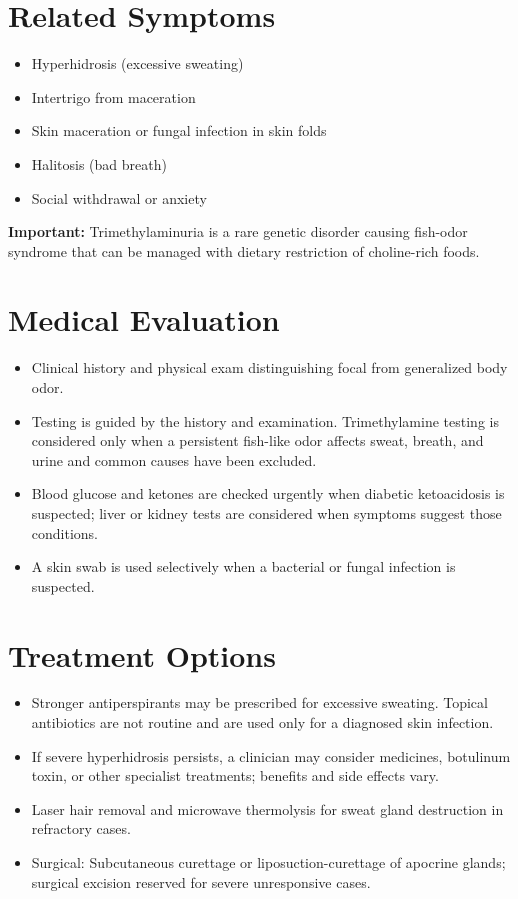 \section*{Related Symptoms}
\begin{itemize}
 \item Hyperhidrosis (excessive sweating)
 \item Intertrigo from maceration
 \item Skin maceration or fungal infection in skin folds
 \item Halitosis (bad breath)
 \item Social withdrawal or anxiety
\end{itemize}
\textbf{Important:} Trimethylaminuria is a rare genetic disorder causing fish-odor syndrome that can be managed with dietary restriction of choline-rich foods.

\section*{Medical Evaluation}
\begin{itemize}
 \item Clinical history and physical exam distinguishing focal from generalized body odor.
 \item Testing is guided by the history and examination. Trimethylamine testing is considered only when a persistent fish-like odor affects sweat, breath, and urine and common causes have been excluded.
 \item Blood glucose and ketones are checked urgently when diabetic ketoacidosis is suspected; liver or kidney tests are considered when symptoms suggest those conditions.
 \item A skin swab is used selectively when a bacterial or fungal infection is suspected.
\end{itemize}

\section*{Treatment Options}
\begin{itemize}
 \item Stronger antiperspirants may be prescribed for excessive sweating. Topical antibiotics are not routine and are used only for a diagnosed skin infection.
 \item If severe hyperhidrosis persists, a clinician may consider medicines, botulinum toxin, or other specialist treatments; benefits and side effects vary.
 \item Laser hair removal and microwave thermolysis for sweat gland destruction in refractory cases.
 \item Surgical: Subcutaneous curettage or liposuction-curettage of apocrine glands; surgical excision reserved for severe unresponsive cases.
\end{itemize}

